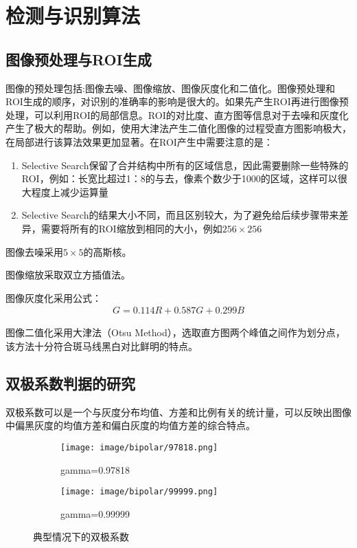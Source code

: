 \chapter{检测与识别算法}
\label{cha:algo}

\section{图像预处理与ROI生成}
图像的预处理包括:图像去噪、图像缩放、图像灰度化和二值化。图像预处理和ROI生成的顺序，对识别的准确率的影响是很大的。如果先产生ROI再进行图像预处理，可以利用ROI的局部信息。ROI的对比度、直方图等信息对于去噪和灰度化产生了极大的帮助。例如，使用大津法产生二值化图像的过程受直方图影响极大，在局部进行该算法效果更加显著。在ROI产生中需要注意的是：
\begin{enumerate}
    \item Selective Search保留了合并结构中所有的区域信息，因此需要删除一些特殊的ROI，例如：长宽比超过1：8的与去，像素个数少于1000的区域，这样可以很大程度上减少运算量
    \item Selective Search的结果大小不同，而且区别较大，为了避免给后续步骤带来差异，需要将所有的ROI缩放到相同的大小，例如$256\times 256$
\end{enumerate}\par
图像去噪采用$5\times 5$的高斯核。\par
图像缩放采取双立方插值法。\par
图像灰度化采用公式：
\begin{align}
G=0.114R+0.587G+0.299B
\end{align}\par
图像二值化采用大津法（Otsu Method），选取直方图两个峰值之间作为划分点，该方法十分符合斑马线黑白对比鲜明的特点。

\section{双极系数判据的研究}
双极系数可以是一个与灰度分布均值、方差和比例有关的统计量，可以反映出图像中偏黑灰度的均值方差和偏白灰度的均值方差的综合特点。

\begin{figure}[h]
    \centering
    \begin{subfigure}{.5\textwidth}
      \centering
      \texttt{[image: image/bipolar/97818.png]}
      \caption{gamma=0.97818}
    \end{subfigure}%
    \begin{subfigure}{.5\textwidth}
      \centering
      \texttt{[image: image/bipolar/99999.png]}
      \caption{gamma=0.99999}
    \end{subfigure}
    \caption{典型情况下的双极系数}
    \end{figure}

